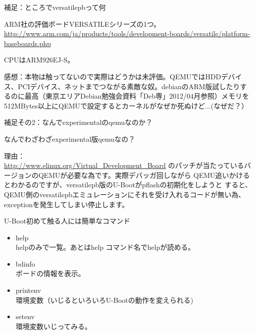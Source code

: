 \begin{frame}{補足：ところでversatilepbって何}

ARM社の評価ボードVERSATILEシリーズの1つ。
\url{http://www.arm.com/ja/products/tools/development-boards/versatile/platform-baseboards.php}

CPUはARM926EJ-S。

感想：本物は触ってないので実際はどうかは未評価。QEMUではHDDデバイス、PCIデバイス、ネットまでつながる素敵な奴。debianのARM版試したりするのに最高（東京エリアDebian勉強会資料「Deb専」2012/04月参照）メモリを512MBytes以上にQEMUで設定するとカーネルがなぜか死ぬけど...(なぜだ？）

\end{frame}

\begin{frame}{補足その2：なんでexperimentalのqemuなのか？}

なんでわざわざexperimental版qemuなの？

理由：\\
\url{http://www.elinux.org/Virtual_Development_Board}
のパッチが当たっているバージョンのQEMUが必要な為です。実際デバッガ回しながら
QEMU追いかけるとわかるのですが、versatilepb版のU-Bootがpflashの初期化をしようと
すると、QEMU側のversatilepbエミュレーションにそれを受け入れるコードが無い為、
exceptionを発生してしまい停止します。

\end{frame}

\begin{frame}{U-Boot初めて触る人には簡単なコマンド}

\begin{itemize}
\item help\\
helpのみで一覧。あとはhelp コマンド名でhelpが読める。
\item bdinfo\\
ボードの情報を表示。
\item printenv \\
環境変数（いじるといろいろU-Bootの動作を変えられる)
\item setenv \\
環境変数いじってみる。
\end{itemize}

\end{frame}

